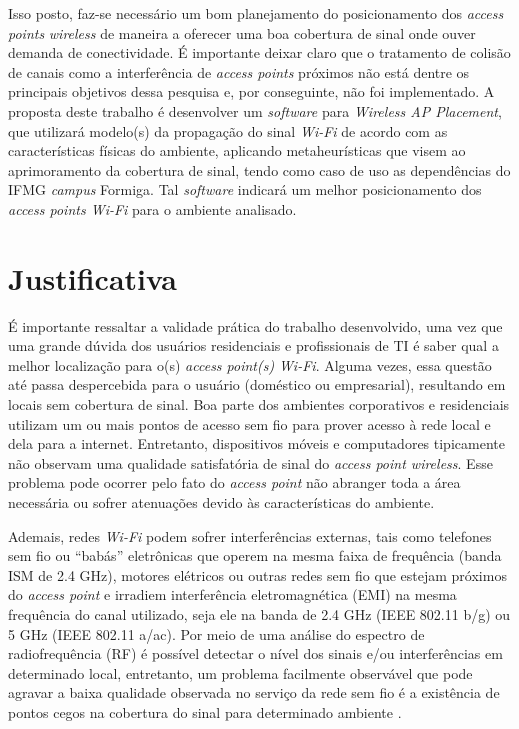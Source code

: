 \documentclass[
	12pt,				%
	twoside,			%
	a4paper,			%
	english,			%
	french,				%
	spanish,			%
	brazil				%
	]{abntex2}
\begin{document}
Isso posto, faz-se necessário um bom planejamento do posicionamento dos
\emph{access points} \emph{wireless} de maneira a oferecer uma boa
cobertura de sinal onde ouver demanda de conectividade. É importante
deixar claro que o tratamento de colisão de canais como a interferência
de \emph{access points} próximos não está dentre os principais objetivos
dessa pesquisa e, por conseguinte, não foi implementado. A proposta
deste trabalho é desenvolver um \emph{software} para \emph{Wireless AP
Placement}, que utilizará modelo(s) da propagação do sinal \emph{Wi-Fi}
de acordo com as características físicas do ambiente, aplicando
metaheurísticas que visem ao aprimoramento da cobertura de sinal, tendo
como caso de uso as dependências do IFMG \emph{campus} Formiga. Tal
\emph{software} indicará um melhor posicionamento dos \emph{access
points Wi-Fi} para o ambiente analisado.

\section{Justificativa}\label{justificativa}

É importante ressaltar a validade prática do trabalho desenvolvido, uma
vez que uma grande dúvida dos usuários residenciais e profissionais de
TI é saber qual a melhor localização para o(s) \emph{access point(s)}
\emph{Wi-Fi}. Alguma vezes, essa questão até passa despercebida para o
usuário (doméstico ou empresarial), resultando em locais sem cobertura
de sinal. Boa parte dos ambientes corporativos e residenciais utilizam
um ou mais pontos de acesso sem fio para prover acesso à rede local e
dela para a internet. Entretanto, dispositivos móveis e computadores
tipicamente não observam uma qualidade satisfatória de sinal do
\emph{access point wireless}. Esse problema pode ocorrer pelo fato do
\emph{access point} não abranger toda a área necessária ou sofrer
atenuações devido às características do ambiente.

Ademais, redes \emph{Wi-Fi} podem sofrer interferências externas, tais
como telefones sem fio ou ``babás'' eletrônicas que operem na mesma
faixa de frequência (banda ISM de 2.4 GHz), motores elétricos ou outras
redes sem fio que estejam próximos do \emph{access point} e irradiem
interferência eletromagnética (EMI) na mesma frequência do canal
utilizado, seja ele na banda de 2.4 GHz (IEEE 802.11 b/g) ou 5 GHz (IEEE
802.11 a/ac). Por meio de uma análise do espectro de radiofrequência
(RF) é possível detectar o nível dos sinais e/ou interferências em
determinado local, entretanto, um problema facilmente observável que
pode agravar a baixa qualidade observada no serviço da rede sem fio é a
existência de pontos cegos na cobertura do sinal para determinado
ambiente \cite{RUBINSTEINS}.
\end{document}
